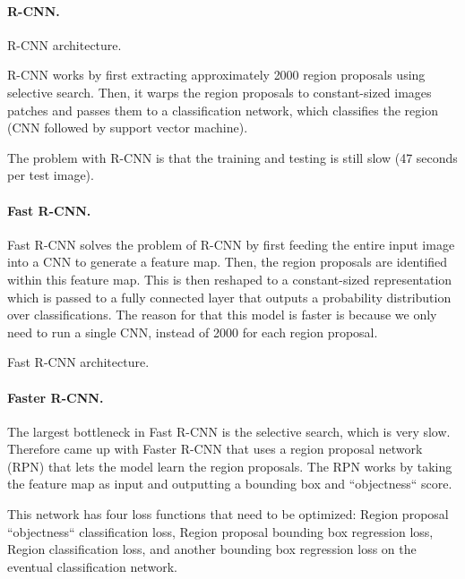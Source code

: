 \paragraph{R-CNN.}

\begin{marginfigure}
    \centering
    \caption{R-CNN architecture.}
    \label{fig:r-cnn}
\end{marginfigure}

R-CNN \citep{girshick2014rich} works by first extracting approximately 2000
region proposals using selective search. Then, it warps the region proposals to
constant-sized images patches and passes them to a classification network,
which classifies the region (CNN followed by support vector machine).

The problem with R-CNN is that the training and testing is still slow (47
seconds per test image).

\paragraph{Fast R-CNN.}

Fast R-CNN \citep{girshick2015fast} solves the problem of R-CNN by first
feeding the entire input image into a CNN to generate a feature map. Then, the
region proposals are identified within this feature map. This is then reshaped
to a constant-sized representation which is passed to a fully connected layer
that outputs a probability distribution over classifications. The reason for
that this model is faster is because we only need to run a single CNN, instead
of 2000 for each region proposal.

\begin{marginfigure}
    \centering
    \caption{Fast R-CNN architecture.}
    \label{fig:fast-r-cnn}
\end{marginfigure}

\paragraph{Faster R-CNN.} 

The largest bottleneck in Fast R-CNN is the selective search, which is very
slow. Therefore \citet{ren2015faster} came up with Faster R-CNN that uses a
region proposal network (RPN) that lets the model learn the region proposals.
The RPN works by taking the feature map as input and outputting a bounding box
and ``objectness`` score.

This network has four loss functions that need to be optimized: Region proposal
``objectness`` classification loss, Region proposal bounding box regression
loss, Region classification loss, and another bounding box regression loss on
the eventual classification network.

